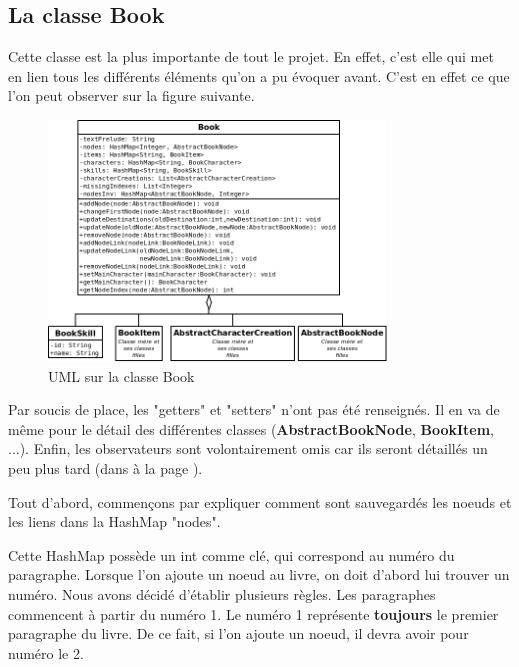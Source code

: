		\subsection{La classe Book}
			\label{sub:book}

			Cette classe est la plus importante de tout le projet. En effet, c'est elle qui met en lien tous les différents éléments qu'on a pu évoquer avant. C'est en effet ce que l'on peut observer sur la figure suivante.

			\begin{figure}[H]
				\centering\includegraphics[width=0.8\textwidth, keepaspectratio]{img/book.png}
				\caption{UML sur la classe Book}
			\end{figure}

			Par soucis de place, les "getters" et "setters" n'ont pas été renseignés. Il en va de même pour le détail des différentes classes (\textbf{AbstractBookNode}, \textbf{BookItem}, ...). Enfin, les observateurs sont volontairement omis car ils seront détaillés un peu plus tard (dans  à la page \pageref{subsec:pattern_observer}).

			Tout d'abord, commençons par expliquer comment sont sauvegardés les noeuds et les liens dans la HashMap "nodes".

			Cette HashMap possède un int comme clé, qui correspond au numéro du paragraphe. Lorsque l'on ajoute un noeud au livre, on doit d'abord lui trouver un numéro. Nous avons décidé d'établir plusieurs règles. Les paragraphes commencent à partir du numéro 1. Le numéro 1 représente \textbf{toujours} le premier paragraphe du livre. De ce fait, si l'on ajoute un noeud, il devra avoir pour numéro le 2.

